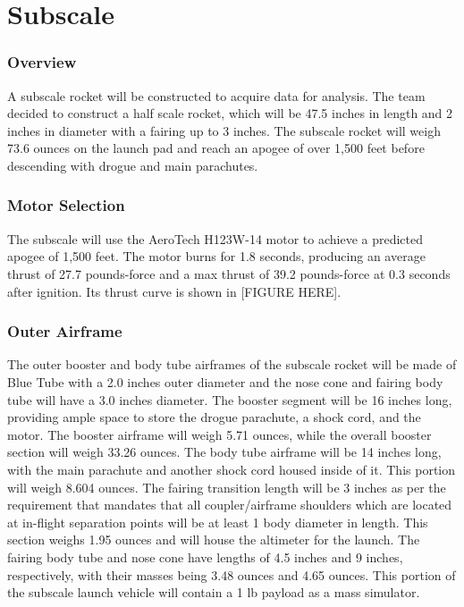 \chapter{Subscale}
\subsection{Overview}
A subscale rocket will be constructed to acquire data for analysis. The team decided to construct a half scale rocket, which will be 47.5 inches in length and 2 inches in diameter with a fairing up to 3 inches. The subscale rocket will weigh 73.6 ounces on the launch pad and reach an apogee of over 1,500 feet before descending with drogue and main parachutes.
    

    \subsection{Motor Selection}
    The subscale will use the AeroTech H123W-14 motor to achieve a predicted apogee of 1,500 feet. The motor burns for 1.8 seconds, producing an average thrust of 27.7 pounds-force and a max thrust of 39.2 pounds-force at 0.3 seconds after ignition. Its thrust curve is shown in [FIGURE HERE].

    
    
    \subsection{Outer Airframe}
The outer booster and body tube airframes of the subscale rocket will be made of Blue Tube with a 2.0 inches outer diameter and the nose cone and fairing body tube will have a 3.0 inches diameter. The booster segment will be 16 inches long, providing ample space to store the drogue parachute, a shock cord, and the motor. The booster airframe will weigh 5.71 ounces, while the overall booster section will weigh 33.26 ounces. The body tube airframe will be 14 inches long, with the main parachute and another shock cord housed inside of it. This portion will weigh 8.604 ounces. The fairing transition length will be 3 inches as per the requirement that mandates that all coupler/airframe shoulders which are located at in-flight separation points will be at least 1 body diameter in length. This section weighs 1.95 ounces and will house the altimeter for the launch. The fairing body tube and nose cone have lengths of 4.5 inches and 9 inches, respectively, with their masses being 3.48 ounces and 4.65 ounces. This portion of the subscale launch vehicle will contain a 1 lb payload as a mass simulator.

